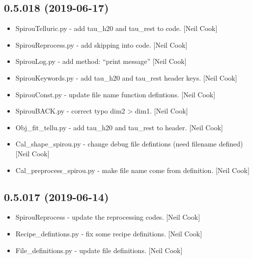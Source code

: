 \documentclass[a4paper,10pt,english]{report}
\begin{document}
\subsection{0.5.018 (2019-06-17)}
\label{\detokenize{misc/changelog:id117}}\begin{itemize}
\item {} 
SpirouTelluric.py - add tau\_h20 and tau\_rest to code. {[}Neil Cook{]}

\item {} 
SpirouReprocess.py - add skipping into code. {[}Neil Cook{]}

\item {} 
SpirouLog.py - add method: “print message” {[}Neil Cook{]}

\item {} 
SpirouKeywords.py - add tau\_h20 and tau\_rest header keys. {[}Neil Cook{]}

\item {} 
SpirouConst.py - update file name function defintions. {[}Neil Cook{]}

\item {} 
SpirouBACK.py - correct typo dim2 \textendash{}\textgreater{} dim1. {[}Neil Cook{]}

\item {} 
Obj\_fit\_tellu.py - add tau\_h20 and tau\_rest to header. {[}Neil Cook{]}

\item {} 
Cal\_shape\_spirou.py - change debug file defintions (need filename
defined) {[}Neil Cook{]}

\item {} 
Cal\_preprocess\_spirou.py - make file name come from definition. {[}Neil
Cook{]}

\end{itemize}


\subsection{0.5.017 (2019-06-14)}
\label{\detokenize{misc/changelog:id118}}\begin{itemize}
\item {} 
SpirouReprocess - update the reprocessing codes. {[}Neil Cook{]}

\item {} 
Recipe\_defintions.py - fix some recipe definitions. {[}Neil Cook{]}

\item {} 
File\_definitions.py - update file definitions. {[}Neil Cook{]}

\end{itemize}
\end{document}
